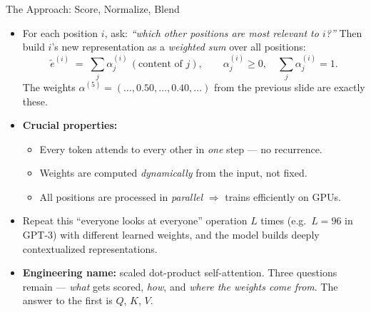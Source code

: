 \begin{frame}{The Approach: Score, Normalize, Blend}
\begin{itemize}
\item For each position $i$, ask: \emph{``which other positions are most relevant to $i$?''} Then build $i$'s new representation as a \emph{weighted sum} over all positions:
\[
   \tilde e^{(i)} \;=\; \sum_{j} \alpha_{j}^{(i)}\,(\text{content of } j), \qquad
   \alpha_{j}^{(i)} \ge 0, \quad \sum_{j}\alpha_{j}^{(i)} = 1.
\]
The weights $\alpha^{(5)} = (\ldots, 0.50, \ldots, 0.40, \ldots)$ from the previous slide are exactly these.

\medskip
\item \textbf{Crucial properties:}
\begin{itemize}
    \item Every token attends to every other in \emph{one} step --- no recurrence.
    \item Weights are computed \emph{dynamically} from the input, not fixed.
    \item All positions are processed in \emph{parallel} $\Rightarrow$ trains efficiently on GPUs.
\end{itemize}

\medskip
\item Repeat this ``everyone looks at everyone'' operation $L$ times (e.g.\ $L=96$ in GPT-3) with different learned weights, and the model builds deeply contextualized representations.

\medskip
\item \textbf{Engineering name:} scaled dot-product self-attention. Three questions remain --- \emph{what} gets scored, \emph{how}, and \emph{where the weights come from}. The answer to the first is $Q$, $K$, $V$.
\end{itemize}
\end{frame}

